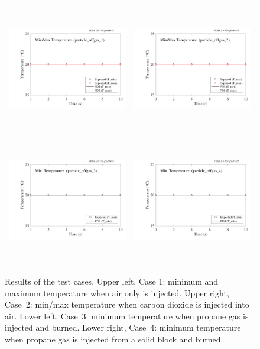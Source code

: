 \documentclass[11pt]{book}
\begin{document}
\begin{figure}[!ht]
\begin{tabular*}{\textwidth}{lr}
\includegraphics[height=2.2in]{SCRIPT_FIGURES/particle_offgas_1} &
\includegraphics[height=2.2in]{SCRIPT_FIGURES/particle_offgas_2} \\
\includegraphics[height=2.2in]{SCRIPT_FIGURES/particle_offgas_3} &
\includegraphics[height=2.2in]{SCRIPT_FIGURES/particle_offgas_4}
\end{tabular*}
\caption[The  test cases]{Results of the  test cases. Upper left, Case 1: minimum and maximum temperature when air only is injected. Upper right, Case~2: min/max temperature when carbon dioxide is injected into air. Lower left, Case~3: minimum temperature when propane gas is injected and burned. Lower right, Case~4: minimum temperature when propane gas is injected from a solid block and burned. }
\label{particle_offgas_plots}
\end{figure}
\end{document}
